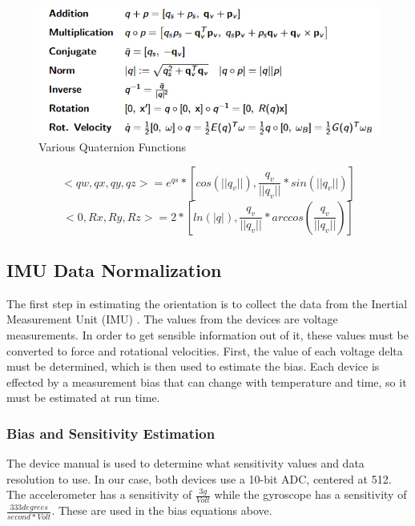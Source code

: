 \documentclass[a4paper]{article}
\begin{document}
\begin{figure}[h]
  \centering
    \includegraphics[width=1\textwidth]{quat_eq.png}
  \caption{Various Quaternion Functions\label{fig:quat_eq}}
\end{figure}

\begin{equation*}\label{eq:eul2quat}
<qw,qx,qy,qz> 	= e^{qs} * [cos(||q_v||),\frac{q_v}{||q_v||} * sin(||q_v||)]
\end{equation*}
\begin{equation*}\label{eq:quat2eul}
<0,Rx,Ry,Rz>		= 2 *[ln(|q|),\frac{q_v}{||q_v||}*arccos(\frac{q_v}{||q_v||})]
\end{equation*}

\subsection{IMU Data Normalization}

The first step in estimating the orientation is to collect the data from the Inertial Measurement Unit (IMU) \cite{IMU}. The values from the devices are voltage measurements. In order to get sensible information out of it, these values must be converted to force and rotational velocities. First, the value of each voltage delta must be determined, which is then used to estimate the bias. Each device is effected by a measurement bias that can change with temperature and time, so it must be estimated at run time.

\subsubsection{Bias and Sensitivity Estimation}

The device manual is used to determine what sensitivity values and data resolution to use. In our case, both devices use a 10-bit ADC, centered at 512. The accelerometer has a sensitivity of $\frac{3g}{Volt}$ while the gyroscope has a sensitivity of $\frac{333 degrees}{second * Volt}$. These are used in the bias equations above.
\end{document}
